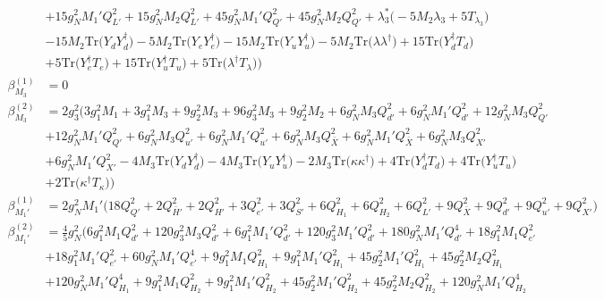 {\begin{align}
 &+15 g_{N}^{2} M_1' Q_{L'}^{2} +15 g_{N}^{2} M_2 Q_{L'}^{2} +45 g_{N}^{2} M_1' Q_{Q'}^{2} +45 g_{N}^{2} M_2 Q_{Q'}^{2} +\lambda_3^* \Big(-5 M_2 \lambda_3  + 5 T_{\lambda_3} \Big)\nonumber \\ 
 &-15 M_2 \mbox{Tr}\Big({Y_d  Y_{d}^{\dagger}}\Big) -5 M_2 \mbox{Tr}\Big({Y_e  Y_{e}^{\dagger}}\Big) -15 M_2 \mbox{Tr}\Big({Y_u  Y_{u}^{\dagger}}\Big) -5 M_2 \mbox{Tr}\Big({\lambda  \lambda^{\dagger}}\Big) +15 \mbox{Tr}\Big({Y_{d}^{\dagger}  T_d}\Big) \nonumber \\ 
 &+5 \mbox{Tr}\Big({Y_{e}^{\dagger}  T_e}\Big) +15 \mbox{Tr}\Big({Y_{u}^{\dagger}  T_u}\Big) +5 \mbox{Tr}\Big({\lambda^{\dagger}  T_{\lambda}}\Big) \Big)\\ 
\beta_{M_3}^{(1)} & =  
0\\ 
\beta_{M_3}^{(2)} & =  
2 g_{3}^{2} \Big(3 g_{1}^{2} M_1 +3 g_{1}^{2} M_3 +9 g_{2}^{2} M_3 +96 g_{3}^{2} M_3 +9 g_{2}^{2} M_2 +6 g_{N}^{2} M_3 Q_{d'}^{2} +6 g_{N}^{2} M_1' Q_{d'}^{2} +12 g_{N}^{2} M_3 Q_{Q'}^{2} \nonumber \\ 
 &+12 g_{N}^{2} M_1' Q_{Q'}^{2} +6 g_{N}^{2} M_3 Q_{u'}^{2} +6 g_{N}^{2} M_1' Q_{u'}^{2} +6 g_{N}^{2} M_3 Q_{\bar{X}}^{2} +6 g_{N}^{2} M_1' Q_{\bar{X}}^{2} +6 g_{N}^{2} M_3 Q_{X'}^{2} \nonumber \\ 
 &+6 g_{N}^{2} M_1' Q_{X'}^{2} -4 M_3 \mbox{Tr}\Big({Y_d  Y_{d}^{\dagger}}\Big) -4 M_3 \mbox{Tr}\Big({Y_u  Y_{u}^{\dagger}}\Big) -2 M_3 \mbox{Tr}\Big({\kappa  \kappa^{\dagger}}\Big) +4 \mbox{Tr}\Big({Y_{d}^{\dagger}  T_d}\Big) +4 \mbox{Tr}\Big({Y_{u}^{\dagger}  T_u}\Big) \nonumber \\ 
 &+2 \mbox{Tr}\Big({\kappa^{\dagger}  T_{\kappa}}\Big) \Big)\\ 
\beta_{M_1'}^{(1)} & =  
2 g_{N}^{2} M_1' \Big(18 Q_{Q'}^{2}  + 2 Q_{\bar{H}'}^{2}  + 2 Q_{H'}^{2}  + 3 Q_{e'}^{2}  + 3 Q_{S'}^{2}  + 6 Q_{H_1}^{2}  + 6 Q_{H_2}^{2}  + 6 Q_{L'}^{2}  + 9 Q_{\bar{X}}^{2}  + 9 Q_{d'}^{2}  + 9 Q_{u'}^{2}  + 9 Q_{X'}^{2} \Big)\\ 
\beta_{M_1'}^{(2)} & =  
\frac{4}{5} g_{N}^{2} \Big(6 g_{1}^{2} M_1 Q_{d'}^{2} +120 g_{3}^{2} M_3 Q_{d'}^{2} +6 g_{1}^{2} M_1' Q_{d'}^{2} +120 g_{3}^{2} M_1' Q_{d'}^{2} +180 g_{N}^{2} M_1' Q_{d'}^{4} +18 g_{1}^{2} M_1 Q_{e'}^{2} \nonumber \\ 
 &+18 g_{1}^{2} M_1' Q_{e'}^{2} +60 g_{N}^{2} M_1' Q_{e'}^{4} +9 g_{1}^{2} M_1 Q_{H_1}^{2} +9 g_{1}^{2} M_1' Q_{H_1}^{2} +45 g_{2}^{2} M_1' Q_{H_1}^{2} +45 g_{2}^{2} M_2 Q_{H_1}^{2} \nonumber \\ 
 &+120 g_{N}^{2} M_1' Q_{H_1}^{4} +9 g_{1}^{2} M_1 Q_{H_2}^{2} +9 g_{1}^{2} M_1' Q_{H_2}^{2} +45 g_{2}^{2} M_1' Q_{H_2}^{2} +45 g_{2}^{2} M_2 Q_{H_2}^{2} +120 g_{N}^{2} M_1' Q_{H_2}^{4} \nonumber \\ 

\end{align}}
